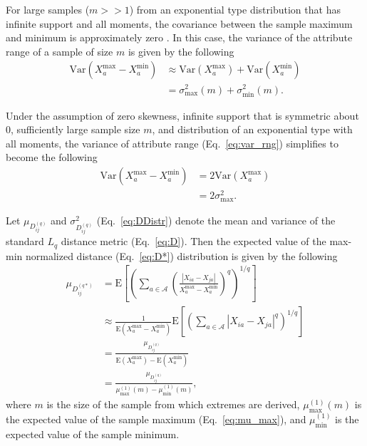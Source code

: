 \documentclass[aoas]{imsart}
\begin{document}
For large samples ($m >> 1$) from an exponential type distribution that has infinite support and all moments, the covariance between the sample maximum and minimum is approximately zero \cite{gumbel1947}. In this case, the variance of the attribute range of a sample of size $m$ is given by the following
%
\begin{equation}\label{eq:var_rng}
\begin{aligned}
\text{Var}(X^\text{max}_a - X^\text{min}_a) &\approx \text{Var}(X^\text{max}_a) + \text{Var}(X^\text{min}_a) \\
&= \sigma^2_\text{max}(m) + \sigma^2_\text{min}(m).
\end{aligned}
\end{equation}

Under the assumption of zero skewness, infinite support that is symmetric about 0, sufficiently large sample size $m$, and distribution of an exponential type with all moments, the variance of attribute range (Eq.~\ref{eq:var_rng}) simplifies to become the following
%
\begin{equation}\label{eq:var_rng_symm}
\begin{aligned}
\text{Var}(X^\text{max}_a - X^\text{min}_a) &= 2 \text{Var}(X^\text{max}_a) \\
&= 2 \sigma^2_\text{max}.
\end{aligned}
\end{equation} 

Let $\mu_{D^{(q)}_{ij}}$ and $\sigma^2_{D^{(q)}_{ij}}$ (Eq.~\ref{eq:DDistr}) denote the mean and variance of the standard $L_q$ distance metric (Eq.~\ref{eq:D}). Then the expected value of the max-min normalized distance (Eq.~\ref{eq:D*}) distribution is given by the following
%
\begin{equation}\label{eq:max-min_D_mean}
\begin{aligned}
\mu_{D^{(q*)}_{ij}} &= \text{E}\left[\left(\sum_{a \in \mathcal{A}}\left(\frac{|X_{ia} - X_{ja}|}{X^\text{max}_a - X^\text{min}_a}\right)^q\right)^{1/q}\right] \\
&\approx \frac{1}{\text{E}(X^\text{max}_a - X^\text{min}_a)}\text{E}\left[\left(\sum_{a \in \mathcal{A}}|X_{ia} - X_{ja}|^q\right)^{1/q}\right] \\
&= \frac{\mu_{D^{(q)}_{ij}}}{\text{E}(X^\text{max}_a) - \text{E}(X^\text{min}_a)} \\
&= \frac{\mu_{D^{(q)}_{ij}}}{\mu^{(1)}_\text{max}(m) - \mu^{(1)}_\text{min}(m)},
\end{aligned}
\end{equation}
%
where $m$ is the size of the sample from which extremes are derived, $\mu^{(1)}_\text{max}(m)$ is the expected value of the sample maximum (Eq.~\ref{eq:mu_max}), and $\mu^{(1)}_\text{min}$ is the expected value of the sample minimum. 
\end{document}
